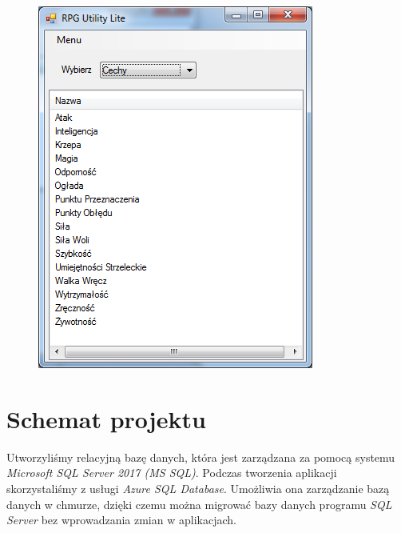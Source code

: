 \documentclass{article}
\begin{document}
\begin{figure}[h!]
\begin{center}
    
\centering
\includegraphics[]{cechy.png}

\end{center}
\end{figure}

\newpage
\section{Schemat projektu}
Utworzyliśmy relacyjną bazę danych, która jest zarządzana za pomocą
systemu \textit{Microsoft SQL Server 2017 (MS SQL)}. Podczas tworzenia aplikacji skorzystaliśmy z usługi \textit{Azure SQL Database}. Umożliwia ona zarządzanie bazą danych w chmurze, dzięki czemu można migrować bazy danych programu \textit{SQL Server} bez wprowadzania zmian w aplikacjach.
\end{document}
